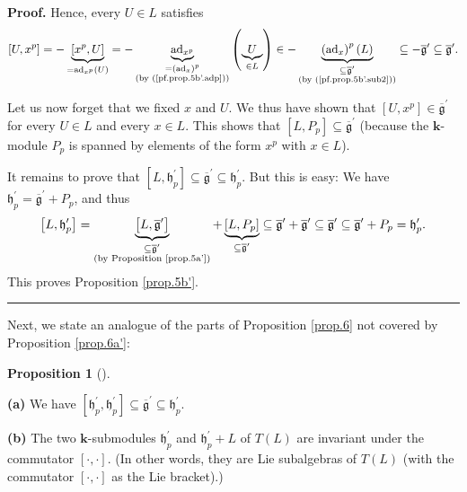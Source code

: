 \documentclass[numbers=enddot,12pt,final,onecolumn,notitlepage]{scrartcl}%
\theoremstyle{definition}
\newtheorem{prop}[theo]{Proposition}
\newenvironment{proposition}[1][]
{\begin{prop}[#1]\begin{leftbar}}
{\end{leftbar}\end{prop}}
\newenvironment{proof}[1][Proof]{\noindent\textbf{#1.} }{\ \rule{0.5em}{0.5em}}
\begin{document}
\begin{proof}
Hence, every $U\in L$ satisfies%
\[
\left[  U,x^{p}\right]  =-\underbrace{\left[  x^{p},U\right]  }%
_{=\operatorname*{ad}\nolimits_{x^{p}}\left(  U\right)  }%
=-\underbrace{\operatorname*{ad}\nolimits_{x^{p}}}_{\substack{=\left(
\operatorname*{ad}\nolimits_{x}\right)  ^{p}\\\text{(by (\ref{pf.prop.5b'.adp}%
))}}}\left(  \underbrace{U}_{\in L}\right)  \in-\underbrace{\left(
\operatorname*{ad}\nolimits_{x}\right)  ^{p}\left(  L\right)  }%
_{\substack{\subseteq\overline{\mathfrak{g}}^{\prime}\\\text{(by
(\ref{pf.prop.5b'.sub2}))}}}\subseteq-\overline{\mathfrak{g}}^{\prime
}\subseteq\overline{\mathfrak{g}}^{\prime}.
\]


Let us now forget that we fixed $x$ and $U$. We thus have shown that $\left[
U,x^{p}\right]  \in\overline{\mathfrak{g}}^{\prime}$ for every $U\in L$ and
every $x\in L$. This shows that $\left[  L,P_{p}\right]  \subseteq
\overline{\mathfrak{g}}^{\prime}$ (because the $\mathbf{k}$-module $P_{p}$ is
spanned by elements of the form $x^{p}$ with $x\in L$).

It remains to prove that $\left[  L,\mathfrak{h}_{p}^{\prime}\right]
\subseteq\overline{\mathfrak{g}}^{\prime}\subseteq\mathfrak{h}_{p}^{\prime}$.
But this is easy: We have $\mathfrak{h}_{p}^{\prime}=\overline{\mathfrak{g}%
}^{\prime}+P_{p}$, and thus%
\[
\left[  L,\mathfrak{h}_{p}^{\prime}\right]  =\underbrace{\left[
L,\overline{\mathfrak{g}}^{\prime}\right]  }_{\substack{\subseteq
\overline{\mathfrak{g}}^{\prime}\\\text{(by Proposition \ref{prop.5a'})}%
}}+\underbrace{\left[  L,P_{p}\right]  }_{\subseteq\overline{\mathfrak{g}%
}^{\prime}}\subseteq\overline{\mathfrak{g}}^{\prime}+\overline{\mathfrak{g}%
}^{\prime}\subseteq\overline{\mathfrak{g}}^{\prime}\subseteq\overline
{\mathfrak{g}}^{\prime}+P_{p}=\mathfrak{h}_{p}^{\prime}.
\]
This proves Proposition \ref{prop.5b'}.
\end{proof}

Next, we state an analogue of the parts of Proposition \ref{prop.6} not
covered by Proposition \ref{prop.6a'}:

\begin{proposition}
\label{prop.6b'}\textbf{(a)} We have $\left[  \mathfrak{h}_{p}^{\prime
},\mathfrak{h}_{p}^{\prime}\right]  \subseteq\overline{\mathfrak{g}}^{\prime
}\subseteq\mathfrak{h}_{p}^{\prime}$. \medskip

\textbf{(b)} The two $\mathbf{k}$-submodules $\mathfrak{h}_{p}^{\prime}$ and
$\mathfrak{h}_{p}^{\prime}+L$ of $T\left(  L\right)  $ are invariant under the
commutator $\left[  \cdot,\cdot\right]  $. (In other words, they are Lie
subalgebras of $T\left(  L\right)  $ (with the commutator $\left[  \cdot
,\cdot\right]  $ as the Lie bracket).)
\end{proposition}
\end{document}
